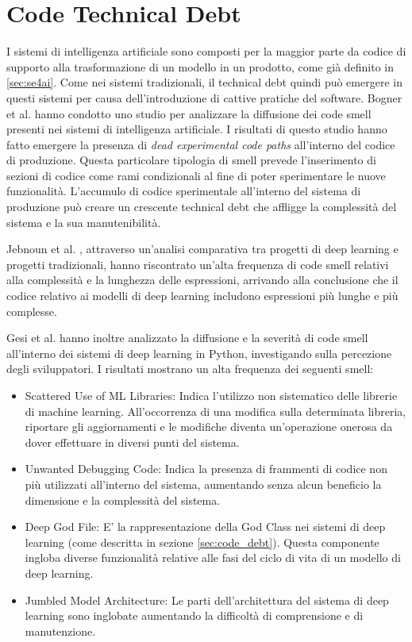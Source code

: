 \section{Code Technical Debt}
I sistemi di intelligenza artificiale sono composti per la maggior parte da codice di supporto alla trasformazione di un modello in un prodotto, come già definito in \ref{sec:se4ai}. Come nei sistemi tradizionali, il technical debt quindi può emergere in questi sistemi per causa dell'introduzione di cattive pratiche del software.
Bogner et al. \cite{bogner2021characterizing} hanno condotto uno studio per analizzare la diffusione dei code smell presenti nei sistemi di intelligenza artificiale. I risultati di questo studio hanno fatto emergere la presenza di \textit{dead experimental code paths} all'interno del codice di produzione. Questa particolare tipologia di smell prevede l'inserimento di sezioni di codice come rami condizionali al fine di poter sperimentare le nuove funzionalità. L'accumulo di codice sperimentale all'interno del sistema di produzione può creare un crescente technical debt che affligge la complessità del sistema e la sua manutenibilità.

Jebnoun et al. \cite{Jebnoun}, attraverso un'analisi comparativa tra progetti di deep learning e progetti tradizionali, hanno riscontrato un'alta frequenza di code smell relativi alla complessità e la lunghezza delle espressioni, arrivando alla conclusione che il codice relativo ai modelli di deep learning includono espressioni più lunghe e più complesse.

Gesi et al. \cite{GesiCSDeepL} hanno inoltre analizzato la diffusione e la severità di code smell all'interno dei sistemi di deep learning in Python, investigando sulla percezione degli sviluppatori. I risultati mostrano un alta frequenza dei seguenti smell:
\begin{itemize}
    \item Scattered Use of ML Libraries: Indica l'utilizzo non sistematico delle librerie di machine learning. All'occorrenza di una modifica sulla determinata libreria, riportare gli aggiornamenti e le modifiche diventa un'operazione onerosa da dover effettuare in diversi punti del sistema.
    \item Unwanted Debugging Code: Indica la presenza di frammenti di codice non più utilizzati all'interno del sistema, aumentando senza alcun beneficio la dimensione e la complessità del sistema.
    \item Deep God File: E' la rappresentazione della God Class nei sistemi di deep learning (come descritta in sezione \ref{sec:code_debt}). Questa componente ingloba diverse funzionalità relative alle fasi del ciclo di vita di un modello di deep learning. 
    \item Jumbled Model Architecture: Le parti dell'architettura del sistema di deep learning sono inglobate aumentando la difficoltà di comprensione e di manutenzione.
\end{itemize}

